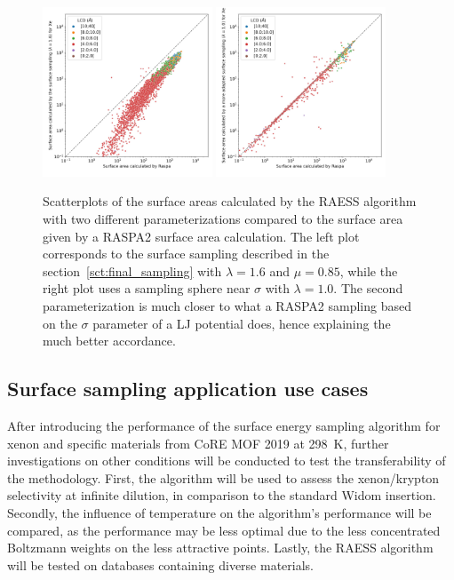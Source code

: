 \documentclass[main]{subfiles}
\begin{document}
\begin{figure}[ht]
  \centering
  \includegraphics[width=0.45\textwidth]{figures/3-fastsim/SA_raspa_Xe_m3_cm3_vs_SA_lambda_1.6_overview.jpg}
  \includegraphics[width=0.45\textwidth]{figures/3-fastsim/SA_raspa_Xe_m3_cm3_vs_SA_lambda_1.0_overview.jpg}
  \caption{Scatterplots of the surface areas calculated by the RAESS algorithm with two different parameterizations compared to the surface area given by a RASPA2 surface area calculation. The left plot corresponds to the surface sampling described in the section~\ref{sct:final_sampling} with $\lambda=1.6$ and $\mu=0.85$, while the right plot uses a sampling sphere near $\sigma$ with $\lambda=1.0$. The second parameterization is much closer to what a RASPA2 sampling based on the $\sigma$ parameter of a LJ potential does, hence explaining the much better accordance. }\label{fgr:surface_area}
\end{figure}

\subsection{Surface sampling application use cases}

After introducing the performance of the surface energy sampling algorithm for xenon and specific materials from CoRE MOF 2019 at \SI{298}{\kelvin}, further investigations on other conditions will be conducted to test the transferability of the methodology. First, the algorithm will be used to assess the xenon/krypton selectivity at infinite dilution, in comparison to the standard Widom insertion. Secondly, the influence of temperature on the algorithm's performance will be compared, as the performance may be less optimal due to the less concentrated Boltzmann weights on the less attractive points. Lastly, the RAESS algorithm will be tested on databases containing diverse materials.
\end{document}
